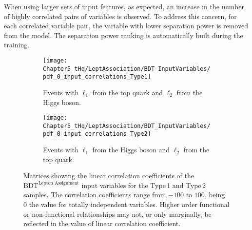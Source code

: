 When using larger sets of input features, as expected, an increase in the number 
of highly correlated pairs of variables is observed. To address this concern, for each 
correlated variable pair, the variable with lower separation power is removed from the model.
The separation power ranking is automatically built during the training.


\begin{figure}[h]
\centering
\begin{subfigure}[b]{0.8\textwidth}
   \texttt{[image: Chapter5\_tHq/LeptAssociation/BDT\_InputVariables/pdf\_0\_input\_correlations\_Type1]}
   \caption{Events with $\ell_{1}$ from the top quark and $\ell_{2}$ from the Higgs boson.}
   \label{fig:dileptau:Assignment_appendix:InputVars:Correlations:Type1} 
\end{subfigure}
\begin{subfigure}[b]{0.8\textwidth}
   \texttt{[image: Chapter5\_tHq/LeptAssociation/BDT\_InputVariables/pdf\_0\_input\_correlations\_Type2]}
   \caption{Events with $\ell_{1}$ from the Higgs boson and $\ell_{2}$ from the top quark.}
   \label{fig:dileptau:Assignment_appendix:InputVars:Correlations:Type2}
\end{subfigure}
\caption{Matrices showing the linear correlation coefficients of the $\text{BDT}^{\text{Lepton Assignment}}$
 input variables for the Type$\,$1 
and Type$\,$2 samples. The correlation coefficients range from $-100$ to $100$, being $0$ the value for 
totally independent variables. Higher order functional or non-functional
relationships may not, or only marginally, be reflected in the value of linear correlation coefficient.}
\label{fig:dileptau:Assignment_appendix:InputVars:Correlations} %
\end{figure}



